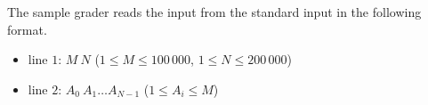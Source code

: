 The sample grader reads the input from the standard input in the following format.

\begin{itemize}
    \item line $1$: $M\ N$ ($1 \le M \le 100\,000$, $1 \le N \le 200\,000$)
    \item line $2$: $A_0\ A_1\ldots A_{N-1}$ ($1 \le A_i \le M$)
\end{itemize}

